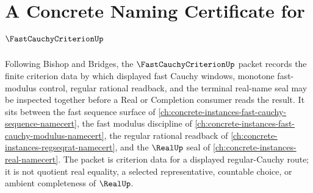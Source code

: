 \chapter{A Concrete Naming Certificate for $\FastCauchyCriterionUp$}
\label{ch:concrete-instances-fast-cauchy-criterion-namecert}

Following Bishop and Bridges, the $\FastCauchyCriterionUp$ packet records the finite criterion data by which displayed fast Cauchy windows, monotone fast-modulus control, regular rational readback, and the terminal real-name seal may be inspected together before a Real or Completion consumer reads the result. It sits between the fast sequence surface of \autoref{ch:concrete-instances-fast-cauchy-sequence-namecert}, the fast modulus discipline of \autoref{ch:concrete-instances-fast-cauchy-modulus-namecert}, the regular rational readback of \autoref{ch:concrete-instances-regseqrat-namecert}, and the $\RealUp$ seal of \autoref{ch:concrete-instances-real-namecert}. The packet is criterion data for a displayed regular-Cauchy route; it is not quotient real equality, a selected representative, countable choice, or ambient completeness of $\RealUp$.

